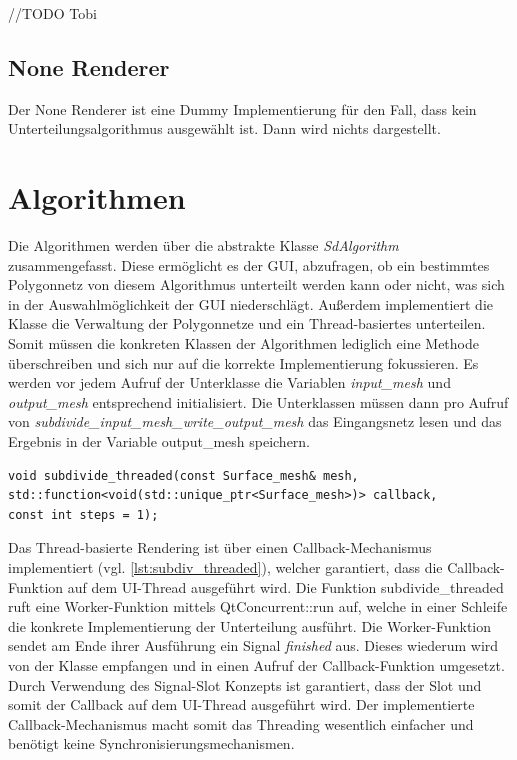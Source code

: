 //TODO Tobi

\subsection{None Renderer}
Der None Renderer ist eine Dummy Implementierung für den Fall,
dass kein Unterteilungsalgorithmus ausgewählt ist.
Dann wird nichts dargestellt.

\section{Algorithmen}

Die Algorithmen werden über die abstrakte Klasse \emph{SdAlgorithm} zusammengefasst. 
Diese ermöglicht es der GUI, abzufragen, ob ein bestimmtes Polygonnetz von diesem Algorithmus unterteilt werden kann oder nicht, was sich in der Auswahlmöglichkeit der GUI niederschlägt.
Außerdem implementiert die Klasse die Verwaltung der Polygonnetze und ein Thread-basiertes unterteilen. 
Somit müssen die konkreten Klassen der Algorithmen lediglich eine Methode überschreiben und sich nur auf die korrekte Implementierung fokussieren.
Es werden vor jedem Aufruf der Unterklasse die Variablen \emph{input\_mesh} und \emph{output\_mesh} entsprechend initialisiert.
Die Unterklassen müssen dann pro Aufruf von \emph{subdivide\_input\_mesh\_write\_output\_mesh} das Eingangsnetz lesen und das Ergebnis in der Variable output\_mesh speichern.

\begin{lstlisting}[style=myCppStyle, caption={Signatur der Unterteilungsfunktion}, label=lst:subdiv_threaded]
void subdivide_threaded(const Surface_mesh& mesh, 
std::function<void(std::unique_ptr<Surface_mesh>)> callback, 
const int steps = 1);
\end{lstlisting}

Das Thread-basierte Rendering ist über einen Callback-Mechanismus implementiert (vgl. \autoref{lst:subdiv_threaded}), welcher garantiert, dass die Callback-Funktion auf dem UI-Thread ausgeführt wird.
Die Funktion subdivide\_threaded ruft eine Worker-Funktion mittels QtConcurrent::run auf, welche in einer Schleife die konkrete Implementierung der Unterteilung ausführt.
Die Worker-Funktion sendet am Ende ihrer Ausführung ein Signal \emph{finished} aus.
Dieses wiederum wird von der Klasse empfangen und in einen Aufruf der Callback-Funktion umgesetzt.
Durch Verwendung des Signal-Slot Konzepts ist garantiert, dass der Slot und somit der Callback auf dem UI-Thread ausgeführt wird.
Der implementierte Callback-Mechanismus macht somit das Threading wesentlich einfacher und benötigt keine Synchronisierungsmechanismen.

